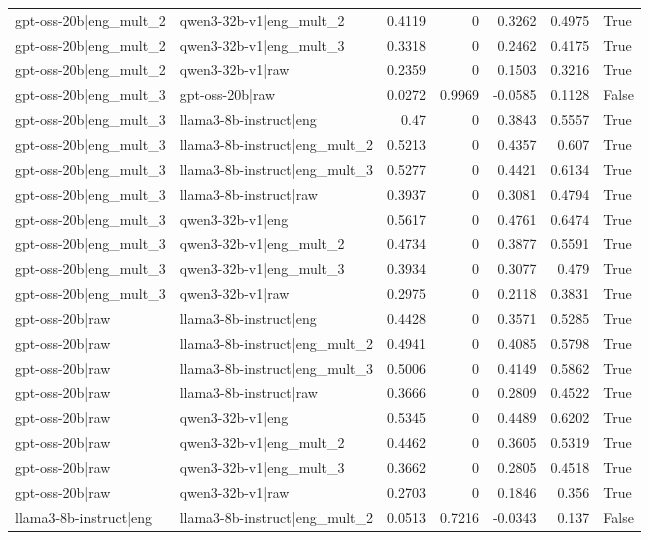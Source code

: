 \begin{table}
\begin{tabular}{l l r r r r l}
gpt-oss-20b|eng_mult_2 & qwen3-32b-v1|eng_mult_2 & 0.4119 & 0 & 0.3262 & 0.4975 & True \\
gpt-oss-20b|eng_mult_2 & qwen3-32b-v1|eng_mult_3 & 0.3318 & 0 & 0.2462 & 0.4175 & True \\
gpt-oss-20b|eng_mult_2 & qwen3-32b-v1|raw & 0.2359 & 0 & 0.1503 & 0.3216 & True \\
gpt-oss-20b|eng_mult_3 & gpt-oss-20b|raw & 0.0272 & 0.9969 & -0.0585 & 0.1128 & False \\
gpt-oss-20b|eng_mult_3 & llama3-8b-instruct|eng & 0.47 & 0 & 0.3843 & 0.5557 & True \\
gpt-oss-20b|eng_mult_3 & llama3-8b-instruct|eng_mult_2 & 0.5213 & 0 & 0.4357 & 0.607 & True \\
gpt-oss-20b|eng_mult_3 & llama3-8b-instruct|eng_mult_3 & 0.5277 & 0 & 0.4421 & 0.6134 & True \\
gpt-oss-20b|eng_mult_3 & llama3-8b-instruct|raw & 0.3937 & 0 & 0.3081 & 0.4794 & True \\
gpt-oss-20b|eng_mult_3 & qwen3-32b-v1|eng & 0.5617 & 0 & 0.4761 & 0.6474 & True \\
gpt-oss-20b|eng_mult_3 & qwen3-32b-v1|eng_mult_2 & 0.4734 & 0 & 0.3877 & 0.5591 & True \\
gpt-oss-20b|eng_mult_3 & qwen3-32b-v1|eng_mult_3 & 0.3934 & 0 & 0.3077 & 0.479 & True \\
gpt-oss-20b|eng_mult_3 & qwen3-32b-v1|raw & 0.2975 & 0 & 0.2118 & 0.3831 & True \\
gpt-oss-20b|raw & llama3-8b-instruct|eng & 0.4428 & 0 & 0.3571 & 0.5285 & True \\
gpt-oss-20b|raw & llama3-8b-instruct|eng_mult_2 & 0.4941 & 0 & 0.4085 & 0.5798 & True \\
gpt-oss-20b|raw & llama3-8b-instruct|eng_mult_3 & 0.5006 & 0 & 0.4149 & 0.5862 & True \\
gpt-oss-20b|raw & llama3-8b-instruct|raw & 0.3666 & 0 & 0.2809 & 0.4522 & True \\
gpt-oss-20b|raw & qwen3-32b-v1|eng & 0.5345 & 0 & 0.4489 & 0.6202 & True \\
gpt-oss-20b|raw & qwen3-32b-v1|eng_mult_2 & 0.4462 & 0 & 0.3605 & 0.5319 & True \\
gpt-oss-20b|raw & qwen3-32b-v1|eng_mult_3 & 0.3662 & 0 & 0.2805 & 0.4518 & True \\
gpt-oss-20b|raw & qwen3-32b-v1|raw & 0.2703 & 0 & 0.1846 & 0.356 & True \\
llama3-8b-instruct|eng & llama3-8b-instruct|eng_mult_2 & 0.0513 & 0.7216 & -0.0343 & 0.137 & False \\

\end{tabular}
\end{table}

